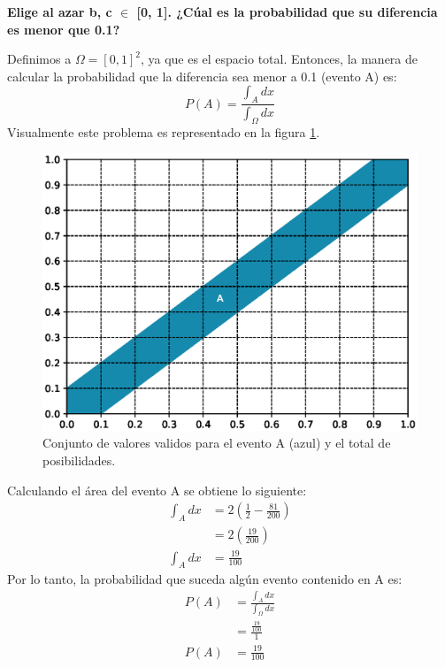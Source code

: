 \item \textbf{Elige al azar b, c $\in$ [0, 1]. ¿Cúal es la probabilidad que su diferencia es menor que 0.1?}

Definimos a $\Omega=[0,1]^2$, ya que es el espacio total. Entonces, la manera de calcular la probabilidad que la diferencia sea menor a 0.1 (evento A) es:
\begin{equation*}
    P(A) = \frac{\int_A dx}{\int_\Omega dx}
\end{equation*}
Visualmente este problema es representado en la figura \ref{figure:probabilidad}.
\begin{figure}[H]
    \centering
    \includegraphics[width=12cm]{Graphics/graphic.eps}
    \caption{Conjunto de valores validos para el evento A (azul) y el total de posibilidades.}
    \label{figure:probabilidad}
\end{figure}
Calculando el área del evento A se obtiene lo siguiente:
\begin{align*}
    \int_A dx & = 2 \left(\frac{1}{2} - \frac{81}{200} \right) \\
              & = 2\left(\frac{19}{200}\right)                 \\
    \int_A dx & = \frac{19}{100}
\end{align*}
Por lo tanto, la probabilidad que suceda algún evento contenido en A es:
\begin{align*}
    P(A) & = \frac{\int_A dx}{\int_\Omega dx} \\
         & = \frac{\frac{19}{100}}{1}         \\
    P(A) & = \frac{19}{100}
\end{align*}